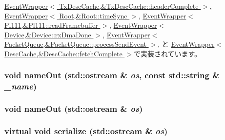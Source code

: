 \hyperlink{classEventWrapper_a6490f765a824ced1cc94979609fe7e07}{EventWrapper$<$ TxDescCache,\&TxDescCache::headerComplete $>$}, \hyperlink{classEventWrapper_a6490f765a824ced1cc94979609fe7e07}{EventWrapper$<$ Root,\&Root::timeSync $>$}, \hyperlink{classEventWrapper_a6490f765a824ced1cc94979609fe7e07}{EventWrapper$<$ Pl111,\&Pl111::readFramebuffer $>$}, \hyperlink{classEventWrapper_a6490f765a824ced1cc94979609fe7e07}{EventWrapper$<$ Device,\&Device::rxDmaDone $>$}, \hyperlink{classEventWrapper_a6490f765a824ced1cc94979609fe7e07}{EventWrapper$<$ PacketQueue,\&PacketQueue::processSendEvent $>$}, と \hyperlink{classEventWrapper_a6490f765a824ced1cc94979609fe7e07}{EventWrapper$<$ DescCache,\&DescCache::fetchComplete $>$}で実装されています。\hypertarget{classSerializable_a740e60580ab34c52937682fd5b21f2b5}{
\subsubsection[{nameOut}]{\setlength{\rightskip}{0pt plus 5cm}void nameOut (std::ostream \& {\em os}, \/  const std::string \& {\em \_\-name})}}
\label{classSerializable_a740e60580ab34c52937682fd5b21f2b5}
\hypertarget{classSerializable_a02882ba301442518e82872ad4574a3f0}{
\subsubsection[{nameOut}]{\setlength{\rightskip}{0pt plus 5cm}void nameOut (std::ostream \& {\em os})}}
\label{classSerializable_a02882ba301442518e82872ad4574a3f0}
\hypertarget{classSerializable_ad6272f80ae37e8331e3969b3f072a801}{
\subsubsection[{serialize}]{\setlength{\rightskip}{0pt plus 5cm}virtual void serialize (std::ostream \& {\em os})}}
\label{classSerializable_ad6272f80ae37e8331e3969b3f072a801}


